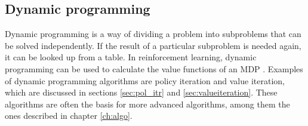 \subsection{Dynamic programming}

Dynamic programming is a way of dividing a problem into subproblems that can be
solved independently. If the result of a particular subproblem is needed again,
it can be looked up from a table. In reinforcement learning, dynamic
programming can be used to calculate the value functions of an MDP
\parencite{bellman1957mdp}. Examples of dynamic programming algorithms are
policy iteration and value iteration, which are discussed in sections
\ref{sec:pol_itr} and \ref{sec:valueiteration}. These algorithms are often the
basis for more advanced algorithms, among them the ones described in chapter
\ref{ch:algo}. 
